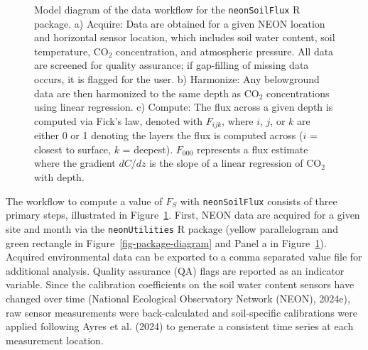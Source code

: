 \documentclass[
  letterpaper,
  DIV=11,
  numbers=noendperiod]{scrartcl}
\begin{document}
\begin{figure}


\caption{\label{fig-model-diagram}Model diagram of the data workflow for
the \texttt{neonSoilFlux} R package. a) Acquire: Data are obtained for a
given NEON location and horizontal sensor location, which includes soil
water content, soil temperature, CO\(_{2}\) concentration, and
atmospheric pressure. All data are screened for quality assurance; if
gap-filling of missing data occurs, it is flagged for the user. b)
Harmonize: Any belowground data are then harmonized to the same depth as
CO\(_{2}\) concentrations using linear regression. c) Compute: The flux
across a given depth is computed via Fick's law, denoted with
\(F_{ijk}\), where \(i\), \(j\), or \(k\) are either 0 or 1 denoting the
layers the flux is computed across (\(i\) = closest to surface, \(k\) =
deepest). \(F_{000}\) represents a flux estimate where the gradient
\(dC/dz\) is the slope of a linear regression of CO\(_{2}\) with depth.}

\end{figure}%

The workflow to compute a value of \(F_{S}\) with \texttt{neonSoilFlux}
consists of three primary steps, illustrated in
Figure~\ref{fig-model-diagram}. First, NEON data are acquired for a
given site and month via the \texttt{neonUtilities} R package (yellow
parallelogram and green rectangle in Figure~\ref{fig-package-diagram}
and Panel a in Figure~\ref{fig-model-diagram}). Acquired environmental
data can be exported to a comma separated value file for additional
analysis. Quality assurance (QA) flags are reported as an indicator
variable. Since the calibration coefficients on the soil water content
sensors have changed over time (National Ecological Observatory Network
(NEON), 2024e), raw sensor measurements were back-calculated and
soil-specific calibrations were applied following Ayres et al. (2024) to
generate a consistent time series at each measurement location.
\end{document}
